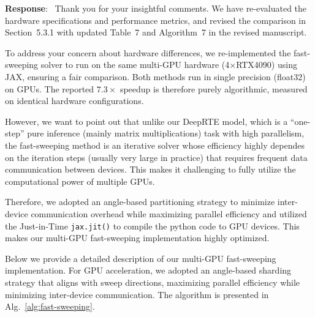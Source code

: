 \documentclass[12pt]{article}
\newcounter{reviewer}
\newcounter{point}[reviewer]
\newenvironment{reply}{\medskip \noindent \textbf{Response}:\  \color{blue}\ignorespaces}{\medskip}
\begin{document}
\begin{reply}
	Thank you for your insightful comments. We have re-evaluated the hardware specifications and performance metrics, and revised the comparison in Section~5.3.1 with updated Table~7 and Algorithm~7 in the revised manuscript.

	To address your concern about hardware differences, we re-implemented the fast-sweeping solver to run on the same multi-GPU hardware (4$\times$RTX4090) using JAX, ensuring a fair comparison. Both methods run in single precision (float32) on GPUs. The reported $7.3\times$ speedup is therefore purely algorithmic, measured on identical hardware configurations.

	However, we want to point out that unlike our DeepRTE model, which is a ``one-step'' pure inference (mainly matrix multiplications) task with high parallelism, the fast-sweeping method is an iterative solver whose efficiency highly dependes on the iteration steps (usually very large in practice) that requires frequent data communication between devices. This makes it challenging to fully utilize the computational power of multiple GPUs.

	Therefore, we adopted an angle-based partitioning strategy to minimize inter-device communication overhead while maximizing parallel efficiency and utilized the Just-in-Time \texttt{jax.jit()} to compile the python code to GPU devices. This makes our multi-GPU fast-sweeping implementation highly optimized.

	Below we provide a detailed description of our multi-GPU fast-sweeping implementation.
	For GPU acceleration, we adopted an angle-based sharding strategy that aligns with sweep directions, maximizing parallel efficiency while minimizing inter-device communication. The algorithm is presented in Alg.~\ref{alg:fast-sweeping}.


\end{reply}
\end{document}
